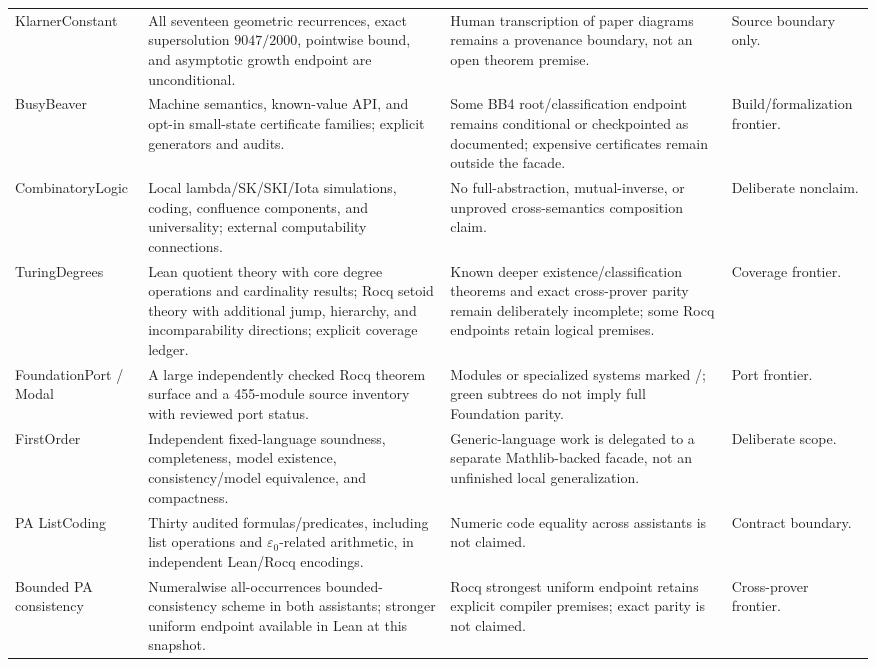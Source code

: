 \documentclass[
  10pt,
  a4paper,
  twoside,
  open=any,
  parskip=half,
  headings=big
]{scrreprt}
\newcommand{\code}[1]{\texttt{\detokenize{#1}}}
\begin{document}
\begin{landscape}
\begin{longtable}{L{.20\linewidth}L{.28\linewidth}L{.28\linewidth}L{.16\linewidth}}
KlarnerConstant &
All seventeen geometric recurrences, exact supersolution
\(9047/2000\), pointwise bound, and asymptotic growth endpoint are
unconditional. &
Human transcription of paper diagrams remains a provenance boundary, not an
open theorem premise. &
Source boundary only.\\

BusyBeaver &
Machine semantics, known-value API, and opt-in small-state certificate
families; explicit generators and audits. &
Some BB4 root/classification endpoint remains conditional or checkpointed as
documented; expensive certificates remain outside the facade. &
Build/formalization frontier.\\

CombinatoryLogic &
Local lambda/SK/SKI/Iota simulations, coding, confluence components, and
universality; external computability connections. &
No full-abstraction, mutual-inverse, or unproved cross-semantics composition
claim. &
Deliberate nonclaim.\\

TuringDegrees &
Lean quotient theory with core degree operations and cardinality results;
Rocq setoid theory with additional jump, hierarchy, and incomparability
directions; explicit coverage ledger. &
Known deeper existence/classification theorems and exact cross-prover parity
remain deliberately incomplete; some Rocq endpoints retain logical premises. &
Coverage frontier.\\

FoundationPort / Modal &
A large independently checked Rocq theorem surface and a 455-module source
inventory with reviewed port status. &
Modules or specialized systems marked \code{partial}/\code{unported}; green
subtrees do not imply full Foundation parity. &
Port frontier.\\

FirstOrder &
Independent fixed-language soundness, completeness, model existence,
consistency/model equivalence, and compactness. &
Generic-language work is delegated to a separate Mathlib-backed facade, not an
unfinished local generalization. &
Deliberate scope.\\

PA ListCoding &
Thirty audited formulas/predicates, including list operations and
\(\varepsilon_0\)-related arithmetic, in independent Lean/Rocq encodings. &
Numeric code equality across assistants is not claimed. &
Contract boundary.\\

Bounded PA consistency &
Numeralwise all-occurrences bounded-consistency scheme in both assistants;
stronger uniform endpoint available in Lean at this snapshot. &
Rocq strongest uniform endpoint retains explicit compiler premises; exact
parity is not claimed. &
Cross-prover frontier.\\


\end{longtable}
\end{landscape}
\end{document}
